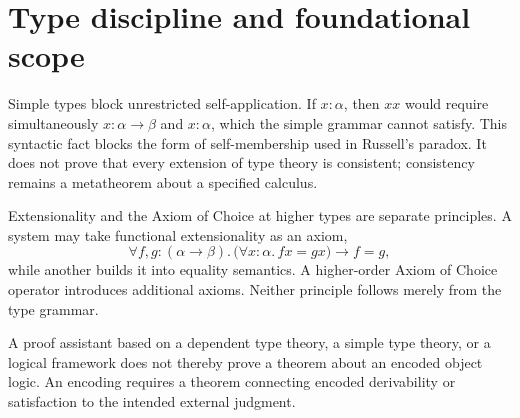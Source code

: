 \section{Type discipline and foundational scope}
\label{sec:simple-type-theory-03}

Simple types block unrestricted self-application.  If \(x:\alpha\), then
\(xx\) would require simultaneously \(x:\alpha\to\beta\) and \(x:\alpha\),
which the simple grammar cannot satisfy.  This syntactic fact blocks the form
of self-membership used in Russell's paradox.  It does not prove that every
extension of type theory is consistent; consistency remains a metatheorem
about a specified calculus.

Extensionality and the Axiom of Choice at higher types are separate principles.  A system
may take functional extensionality as an axiom,
\[
  \forall f,g{:}(\alpha\to\beta).\,
  \bigl(\forall x{:}\alpha.\,fx=gx\bigr)\to f=g,
\]
while another builds it into equality semantics.  A higher-order Axiom of Choice
operator introduces additional axioms.  Neither principle follows merely from
the type grammar.

\begin{warning}
A proof assistant based on a dependent type theory, a simple type theory, or a
logical framework does not thereby prove a theorem about an encoded object
logic.  An encoding requires a theorem connecting encoded derivability or
satisfaction to the intended external judgment.
\end{warning}

